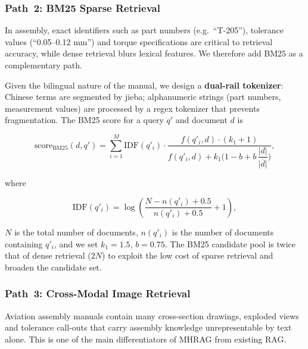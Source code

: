 \documentclass[applsci,article,submit,pdftex,moreauthors]{Definitions/mdpi}
\begin{document}
\subsubsection{Path~2: BM25 Sparse Retrieval}
\label{sec:bm25}

In assembly, exact identifiers such as part numbers (e.g.\ ``T-205''), tolerance values (``0.05--0.12 mm'') and torque specifications are critical to retrieval accuracy, while dense retrieval blurs lexical features. We therefore add BM25 as a complementary path.

Given the bilingual nature of the manual, we design a \textbf{dual-rail tokenizer}: Chinese terms are segmented by jieba; alphanumeric strings (part numbers, measurement values) are processed by a regex tokenizer that prevents fragmentation. The BM25 score for a query $q'$ and document $d$ is
\begin{linenomath}
\begin{equation}
\text{score}_{\text{BM25}}(d, q') = \sum_{i=1}^{M}\text{IDF}(q'_i)\cdot\frac{f(q'_i,d)\cdot(k_1+1)}{f(q'_i,d)+k_1\!\bigl(1-b+b\,\dfrac{|d|}{\overline{|d|}}\bigr)},
\label{eq:bm25}
\end{equation}
\end{linenomath}
where
\begin{linenomath}
\begin{equation}
\text{IDF}(q'_i) = \log\!\left(\frac{N - n(q'_i) + 0.5}{n(q'_i) + 0.5} + 1\right),
\label{eq:idf}
\end{equation}
\end{linenomath}
$N$ is the total number of documents, $n(q'_i)$ is the number of documents containing $q'_i$, and we set $k_1=1.5$, $b=0.75$. The BM25 candidate pool is twice that of dense retrieval ($2N$) to exploit the low cost of sparse retrieval and broaden the candidate set.

\subsubsection{Path~3: Cross-Modal Image Retrieval}
\label{sec:clip}

Aviation assembly manuals contain many cross-section drawings, exploded views and tolerance call-outs that carry assembly knowledge unrepresentable by text alone. This is one of the main differentiators of MHRAG from existing RAG.
\end{document}
